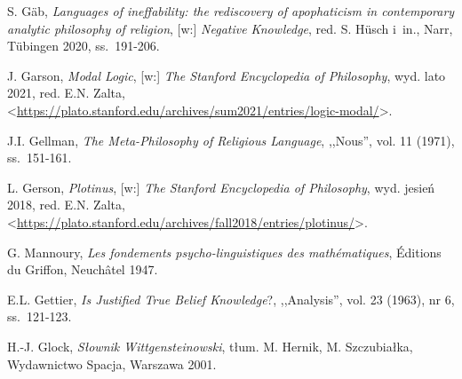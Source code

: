 \begin{thebibliography}{100}

S. Gäb, \textit{Languages of ineffability: the rediscovery of apophaticism in contemporary analytic philosophy of religion},
[w:] \textit{Negative Knowledge}, red. S. Hüsch i~in., Narr, Tübingen 2020, ss.~191-206.

J. Garson, \textit{Modal Logic}, [w:] \textit{The Stanford Encyclopedia of Philosophy},
wyd. lato 2021, red. E.N. Zalta, {\textless}\url{https://plato.stanford.edu/archives/sum2021/entries/logic-modal/}{\textgreater}.


J.I. Gellman, \textit{The Meta-Philosophy of Religious Language}, ,,Nous'', vol. 11 (1971), ss.~151-161.

L. Gerson, \textit{Plotinus}, [w:] \textit{The Stanford Encyclopedia of Philosophy},
wyd. jesień 2018, red. E.N. Zalta, {\textless}\url{https://plato.stanford.edu/archives/fall2018/entries/plotinus/}{\textgreater}.

G. Mannoury, \textit{Les fondements psycho-linguistiques des mathématiques}, Éditions du Griffon, Neuchâtel 1947.

E.L. Gettier, \textit{Is Justified True Belief Knowledge}?, ,,Analysis'', vol. 23 (1963), nr 6, ss.~121-123.


H.-J. Glock, \textit{Słownik Wittgensteinowski}, tłum. M. Hernik, M. Szczubiałka, Wydawnictwo Spacja, Warszawa 2001.



\end{thebibliography}
